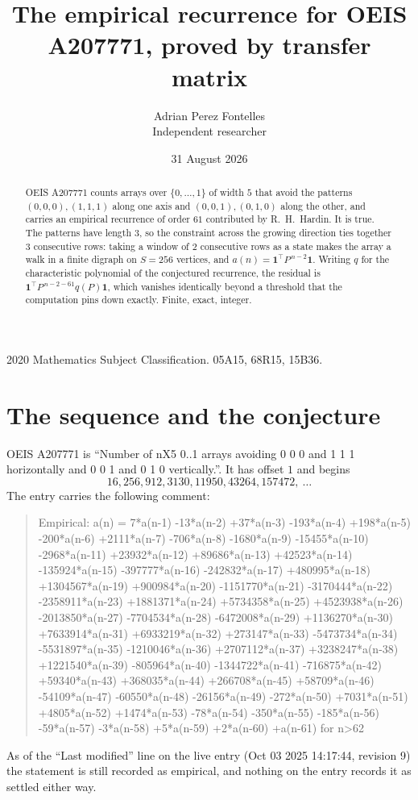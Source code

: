 \documentclass[11pt,a4paper]{article}
\title{The empirical recurrence for OEIS A207771, proved by transfer matrix}
\author{Adrian Perez Fontelles\\ \small Independent researcher}
\date{31 August 2026}
\theoremstyle{plain}
\theoremstyle{definition}
\begin{document}
\maketitle

\begin{abstract}
OEIS A207771 counts arrays over $\{0,\dots,1\}$ of width $5$ that avoid the patterns
$(0,0,0), (1,1,1)$ along one axis and $(0,0,1), (0,1,0)$ along the other, and carries an empirical recurrence of
order $61$ contributed by R.~H.~Hardin. It is true. The patterns have length $3$, so
the constraint across the growing direction ties together $3$ consecutive rows: taking a
window of $2$ consecutive rows as a state makes the array a walk in a finite digraph
on $S=256$ vertices, and $a(n)=\mathbf{1}^{\!\top}P^{\,n-2}\mathbf{1}$. Writing $q$
for the characteristic polynomial of the conjectured recurrence, the residual is
$\mathbf{1}^{\!\top}P^{\,n-2-61}q(P)\mathbf{1}$, which vanishes identically
beyond a threshold that the computation pins down exactly. Finite, exact, integer.
\end{abstract}

\noindent\small 2020 Mathematics Subject Classification. 05A15, 68R15, 15B36.\normalsize

\section{The sequence and the conjecture}

OEIS A207771 is ``Number of nX5 0..1 arrays avoiding 0 0 0 and 1 1 1 horizontally and 0 0 1 and 0 1 0 vertically.''. It has offset
$1$ and begins
\[
16, 256, 912, 3130, 11950, 43264, 157472,\ \dots
\]
The entry carries the following comment:
\begin{quote}\small
Empirical: a(n) = 7*a(n-1) -13*a(n-2) +37*a(n-3) -193*a(n-4) +198*a(n-5) -200*a(n-6) +2111*a(n-7) -706*a(n-8) -1680*a(n-9) -15455*a(n-10) -2968*a(n-11) +23932*a(n-12) +89686*a(n-13) +42523*a(n-14) -135924*a(n-15) -397777*a(n-16) -242832*a(n-17) +480995*a(n-18) +1304567*a(n-19) +900984*a(n-20) -1151770*a(n-21) -3170444*a(n-22) -2358911*a(n-23) +1881371*a(n-24) +5734358*a(n-25) +4523938*a(n-26) -2013850*a(n-27) -7704534*a(n-28) -6472008*a(n-29) +1136270*a(n-30) +7633914*a(n-31) +6933219*a(n-32) +273147*a(n-33) -5473734*a(n-34) -5531897*a(n-35) -1210046*a(n-36) +2707112*a(n-37) +3238247*a(n-38) +1221540*a(n-39) -805964*a(n-40) -1344722*a(n-41) -716875*a(n-42) +59340*a(n-43) +368035*a(n-44) +266708*a(n-45) +58709*a(n-46) -54109*a(n-47) -60550*a(n-48) -26156*a(n-49) -272*a(n-50) +7031*a(n-51) +4805*a(n-52) +1474*a(n-53) -78*a(n-54) -350*a(n-55) -185*a(n-56) -59*a(n-57) -3*a(n-58) +5*a(n-59) +2*a(n-60) +a(n-61) for n>62
\end{quote}
As of the ``Last modified'' line on the live entry (Oct 03 2025 14:17:44, revision
9) the statement is still recorded as empirical, and nothing on the entry
records it as settled either way.
\end{document}
